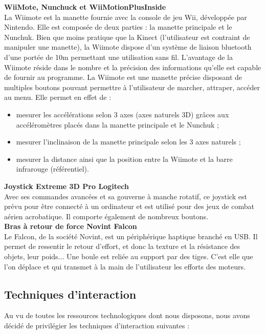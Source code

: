 \textbf{WiiMote, Nunchuck et WiiMotionPlusInside}
\\
La Wiimote est la manette fournie avec la console de jeu Wii, développée par Nintendo. Elle est composée de deux parties : la manette principale et le Nunchuk. Bien que moins pratique que la Kinect (l'utilisateur est contraint de manipuler une manette), la Wiimote dispose d'un système de liaison bluetooth d'une portée de 10m permettant une utilisation sans fil. L'avantage de la Wiimote réside dans le nombre et la précision des informations qu'elle est capable de fournir au programme.
La Wiimote est une manette précise disposant de multiples boutons pouvant permettre à l'utilisateur de marcher, attraper, accéder au menu.
\newline
Elle permet en effet de :
\begin{itemize}
  \item mesurer les accélérations selon 3 axes (axes naturels 3D) grâces aux accéléromètres placés dans la manette principale et le Nunchuk ;
  \item mesurer l'inclinaison de la manette principale selon les 3 axes naturels ;
  \item mesurer la distance ainsi que la position entre la Wiimote et la barre infrarouge (référentiel). \\
\end{itemize}

\textbf{Joystick Extreme 3D Pro Logitech}
\\
Avec ses commandes avancées et sa gouverne à manche rotatif, ce joystick est prévu pour être connecté à un ordinateur et est utilisé pour des jeux de combat aérien acrobatique. Il comporte également de nombreux boutons.
\\

\textbf{Bras à retour de force Novint Falcon}
\\
Le Falcon, de la société Novint, est un périphérique haptique branché en USB. Il permet de ressentir le retour d'effort, et donc la texture et la résistance des objets, leur poids... Une boule est reliée au support par des tiges. C'est elle que l'on déplace et qui transmet à la main de l'utilisateur les efforts des moteurs.
\\

\subsection{Techniques d'interaction}
Au vu de toutes les ressources technologiques dont nous disposons, nous avons décidé de privilégier les techniques d'interaction suivantes :

